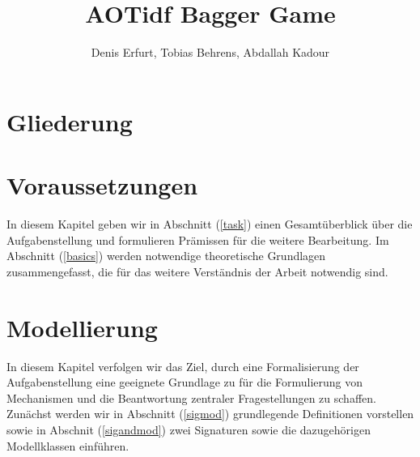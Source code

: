 \documentclass[sigconf]{acmart}
\theoremstyle{break}
\begin{document}
\title{AOTidf Bagger Game}
\author{Denis Erfurt, Tobias Behrens, Abdallah Kadour}

\begin{abstract}
  \noindent
\end{abstract}


\maketitle

\section{Gliederung}

\section{Voraussetzungen}
In diesem Kapitel geben wir in Abschnitt (\ref{task}) einen Gesamtüberblick über die Aufgabenstellung und formulieren Prämissen für die weitere Bearbeitung. Im Abschnitt (\ref{basics}) werden notwendige theoretische Grundlagen zusammengefasst, die für das weitere Verständnis der Arbeit notwendig sind.



\section{Modellierung}
\label{mod}
In diesem Kapitel verfolgen wir das Ziel, durch eine Formalisierung der Aufgabenstellung eine geeignete Grundlage zu für die Formulierung von Mechanismen und die Beantwortung zentraler Fragestellungen zu schaffen. Zunächst werden wir in Abschnitt (\ref{sigmod}) grundlegende Definitionen vorstellen sowie in Abschnit (\ref{sigandmod}) zwei Signaturen sowie die dazugehörigen Modellklassen einführen.
\end{document}
